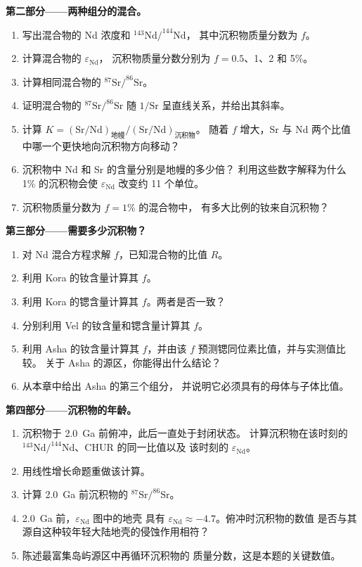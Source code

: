 \begin{problem}
\noindent\textbf{第二部分——两种组分的混合。}
\begin{enumerate}[resume]
\item 写出混合物的 Nd 浓度和 $^{143}\mathrm{Nd}/^{144}\mathrm{Nd}$，
其中沉积物质量分数为 $f$。
\item 计算混合物的 $\varepsilon_{\mathrm{Nd}}$，
沉积物质量分数分别为 $f = 0.5$、1、2 和 5\%。
\item 计算相同混合物的 $^{87}\mathrm{Sr}/^{86}\mathrm{Sr}$。
\item 证明混合物的 $^{87}\mathrm{Sr}/^{86}\mathrm{Sr}$
随 $1/\mathrm{Sr}$ 呈直线关系，并给出其斜率。
\item 计算 $K = (\mathrm{Sr}/\mathrm{Nd})_{\text{地幔}}/(\mathrm{Sr}/\mathrm{Nd})_{\text{沉积物}}$。
随着 $f$ 增大，Sr 与 Nd 两个比值中哪一个更快地向沉积物方向移动？
\item 沉积物中 Nd 和 Sr 的含量分别是地幔的多少倍？
利用这些数字解释为什么 1\% 的沉积物会使
$\varepsilon_{\mathrm{Nd}}$ 改变约 11 个单位。
\item 沉积物质量分数为 $f = 1$\% 的混合物中，
有多大比例的钕来自沉积物？
\end{enumerate}

\noindent\textbf{第三部分——需要多少沉积物？}
\begin{enumerate}[resume]
\item 对 Nd 混合方程求解 $f$，已知混合物的比值 $R$。
\item 利用 Kora 的钕含量计算其 $f$。
\item 利用 Kora 的锶含量计算其 $f$。两者是否一致？
\item 分别利用 Vel 的钕含量和锶含量计算其 $f$。
\item 利用 Asha 的钕含量计算其 $f$，并由该 $f$
预测锶同位素比值，并与实测值比较。
关于 Asha 的源区，你能得出什么结论？
\item 从本章中给出 Asha 的第三个组分，
并说明它必须具有的母体与子体比值。
\end{enumerate}

\noindent\textbf{第四部分——沉积物的年龄。}
\begin{enumerate}[resume]
\item 沉积物于 \qty{2.0}{Ga} 前俯冲，此后一直处于封闭状态。
计算沉积物在该时刻的 $^{143}\mathrm{Nd}/^{144}\mathrm{Nd}$、CHUR 的同一比值以及
该时刻的 $\varepsilon_{\mathrm{Nd}}$。
\item 用线性增长命题重做该计算。
\item 计算 \qty{2.0}{Ga} 前沉积物的 $^{87}\mathrm{Sr}/^{86}\mathrm{Sr}$。
\item \qty{2.0}{Ga} 前，$\varepsilon_{\mathrm{Nd}}$ 图中的地壳
具有 $\varepsilon_{\mathrm{Nd}} \approx -4.7$。俯冲时沉积物的数值
是否与其源自这种较年轻大陆地壳的侵蚀作用相符？
\item 陈述最富集岛屿源区中再循环沉积物的
质量分数，这是本题的关键数值。
\end{enumerate}
\end{problem}
